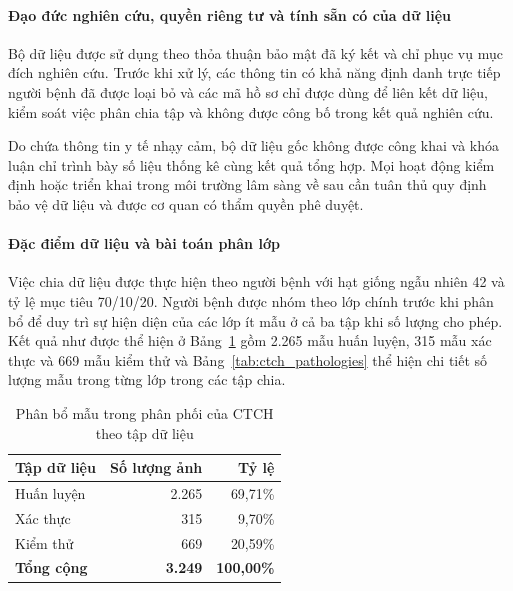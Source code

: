 \paragraph{Đạo đức nghiên cứu, quyền riêng tư và tính sẵn có của dữ liệu}

Bộ dữ liệu được sử dụng theo thỏa thuận bảo mật đã ký kết và chỉ phục vụ mục đích nghiên cứu. Trước khi xử lý, các thông tin có khả năng định danh trực tiếp người bệnh đã được loại bỏ và các mã hồ sơ chỉ được dùng để liên kết dữ liệu, kiểm soát việc phân chia tập và không được công bố trong kết quả nghiên cứu. 

Do chứa thông tin y tế nhạy cảm, bộ dữ liệu gốc không được công khai và khóa luận chỉ trình bày số liệu thống kê cùng kết quả tổng hợp. Mọi hoạt động kiểm định hoặc triển khai trong môi trường lâm sàng về sau cần tuân thủ quy định bảo vệ dữ liệu và được cơ quan có thẩm quyền phê duyệt.

\paragraph{Đặc điểm dữ liệu và bài toán phân lớp}

Việc chia dữ liệu được thực hiện theo người bệnh với hạt giống ngẫu nhiên 42 và tỷ lệ mục tiêu 70/10/20. Người bệnh được nhóm theo lớp chính trước khi phân bổ để duy trì sự hiện diện của các lớp ít mẫu ở cả ba tập khi số lượng cho phép. Kết quả như được thể hiện ở Bảng~\ref{tab:ctch_splits} gồm 2.265 mẫu huấn luyện, 315 mẫu xác thực và 669 mẫu kiểm thử và Bảng~\ref{tab:ctch_pathologies} thể hiện chi tiết số lượng mẫu trong từng lớp trong các tập chia.

\clearpage

\begin{table}[htbp]
\centering
\small
\begin{tabular}{|l|r|r|}
\hline
\textbf{Tập dữ liệu} & \textbf{Số lượng ảnh} & \textbf{Tỷ lệ} \\ \hline
Huấn luyện & 2.265 & 69,71\% \\ \hline
Xác thực & 315 & 9,70\% \\ \hline
Kiểm thử & 669 & 20,59\% \\ \hline
\textbf{Tổng cộng} & \textbf{3.249} & \textbf{100,00\%} \\ \hline
\end{tabular}%
\caption{Phân bổ mẫu trong phân phối của CTCH theo tập dữ liệu}
\label{tab:ctch_splits}
\end{table}

